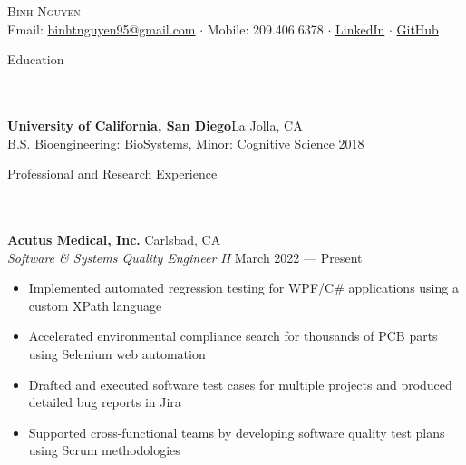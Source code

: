 \documentclass{article}
\newcommand{\lineunder} {
    \vspace*{-8pt} \\
    \hspace*{-18pt} \hrulefill \\
}
\newcommand{\header} [1] {
    {\hspace*{-18pt}\vspace*{6pt} \Large{#1} }
    \vspace*{-6pt} 
    \lineunder
}
\begin{document}

\vspace*{-50pt}


\begin{center}
	{\Huge \scshape {Binh Nguyen}}\\
	\vspace{2mm}
	Email: \href{mailto:binhtnguyen95@gmail.com}{binhtnguyen95@gmail.com} $\cdot$
	Mobile: 209.406.6378 $\cdot$ 
	\href{https://www.linkedin.com/in/binh-t-nguyen} {LinkedIn} $\cdot$ 
	\href{https://www.github.com/howyoubinh}{GitHub}
\end{center}

\header{Education}
\textbf{University of California, San Diego}\hfill La Jolla, CA\\
B.S. Bioengineering: BioSystems, Minor: Cognitive Science \hfill 2018\\
\vspace{7mm}

\header{Professional and Research Experience}

\textbf{Acutus Medical, Inc.} \hfill Carlsbad, CA\\
\textit{Software \& Systems Quality Engineer II} \hfill March 2022 --- Present\\
\vspace{-2mm}
\begin{itemize} \itemsep 0.05pt
	\item Implemented automated regression testing for WPF/C\# applications using a custom XPath language
	\item Accelerated environmental compliance search for thousands of PCB parts using Selenium web automation
	\item Drafted and executed software test cases for multiple projects and produced detailed bug reports in Jira
	\item Supported cross-functional teams by developing software quality test plans using Scrum methodologies
\end{itemize}
\end{document}
